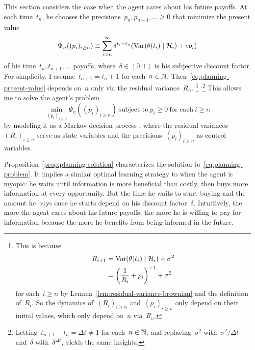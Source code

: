 \documentclass[11pt,oneside]{article}
\begin{document}
This section considers the case when the agent cares about his future payoffs.
At each time~$t_n$, he chooses the precisions~$p_n,p_{n+1},\ldots\ge0$ that minimize the present value
%
\begin{equation}
    \Psi_n((p_i)_{i\ge n})\equiv \sum_{i=n}^\infty\delta^{t_i-t_n}\left(\Var(\theta(t_i)\mid\Hcal_i)+cp_i\right) \label{eq:planning-present-value}
\end{equation}
%
of his time~$t_n,t_{n+1},\ldots$ payoffs, where~$\delta\in(0,1)$ is his subjective discount factor.
For simplicity, I assume~$t_{n+1}=t_n+1$ for each~$n\in\mathbb{N}$.
Then~\eqref{eq:planning-present-value} depends on~$n$ only via the residual variance~$R_n$.%
\footnote{
\label{fn:planning-present-value}%
This is because
%
\begin{align*}
    R_{i+1}
    &= \Var(\theta(t_i)\mid\Hcal_i)+\sigma^2 \\
    &= \left(\frac{1}{R_i}+p_i\right)^{-1}+\sigma^2
\end{align*}
%
for each~$i\ge n$ by Lemma~\ref{lem:residual-variance-brownian} and the definition of~$R_i$.
So the dynamics of~$(R_i)_{i\ge n}$ and~$(p_i)_{i\ge n}$ only depend on their initial values, which only depend on~$n$ via~$R_n$.
}%
\textsuperscript{,}\footnote{
Letting~$t_{n+1}-t_n=\Delta t\not=1$ for each~$n\in\mathbb{N}$, and replacing~$\sigma^2$ with~$\sigma^2/\Delta t$ and~$\delta$ with~$\delta^{\Delta t}$, yields the same insights.
}
This allows me to solve the agent's problem
%
\begin{equation}
    \min_{(p_i)_{i\ge n}}\Psi_n\left((p_i)_{i\ge n}\right)\ \text{subject to}\ p_i\ge0\ \text{for each}\ i\ge n \label{eq:planning-problem}
\end{equation}
%
by modeling it as a Markov decision process \citep{Bellman-1957-JMM}, where the residual variances~$(R_i)_{i\ge n}$ serve as state variables and the precisions~$(p_i)_{i\ge n}$ as control variables.

Proposition~\ref{prop:planning-solution} characterizes the solution to~\eqref{eq:planning-problem}.
It implies a similar optimal learning strategy to when the agent is myopic: he waits until information is more beneficial than costly, then buys more information at every opportunity.
But the time he waits to start buying and the amount he buys once he starts depend on his discount factor~$\delta$.
Intuitively, the more the agent cares about his future payoffs, the more he is willing to pay for information because the more he benefits from being informed in the future.
\end{document}
